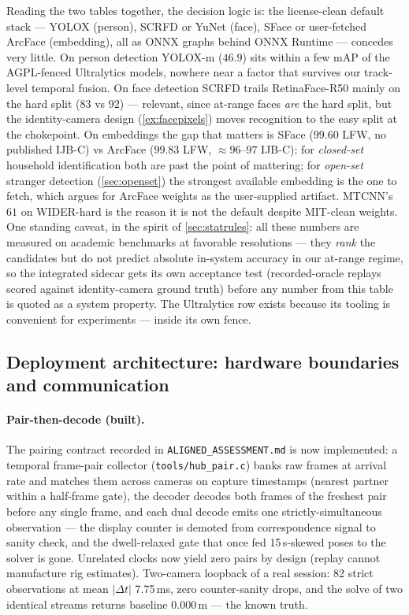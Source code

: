 \documentclass[11pt]{article}
\theoremstyle{definition}
\newcommand{\code}[1]{\texttt{#1}}
\begin{document}
Reading the two tables together, the decision logic is: the
license-clean default stack --- YOLOX (person), SCRFD or YuNet (face),
SFace or user-fetched ArcFace (embedding), all as ONNX graphs behind
ONNX Runtime --- concedes very little. On person detection YOLOX-m
($46.9$) sits within a few mAP of the AGPL-fenced Ultralytics models,
nowhere near a factor that survives our track-level temporal fusion. On
face detection SCRFD trails RetinaFace-R50 mainly on the hard split
($83$ vs $92$) --- relevant, since at-range faces \emph{are} the hard
split, but the identity-camera design (\autoref{ex:facepixels}) moves
recognition to the easy split at the chokepoint. On embeddings the gap
that matters is SFace ($99.60$ LFW, no published IJB-C) vs ArcFace
($99.83$ LFW, $\approx96$--$97$ IJB-C): for \emph{closed-set} household
identification both are past the point of mattering; for \emph{open-set}
stranger detection (\autoref{sec:openset}) the strongest available
embedding is the one to fetch, which argues for ArcFace weights as the
user-supplied artifact. MTCNN's $61$ on WIDER-hard is the reason it is
not the default despite MIT-clean weights. One standing caveat, in the
spirit of \autoref{sec:statrules}: all these numbers are measured on
academic benchmarks at favorable resolutions --- they \emph{rank} the
candidates but do not predict absolute in-system accuracy in our
at-range regime, so the integrated sidecar gets its own acceptance test
(recorded-oracle replays scored against identity-camera ground truth)
before any number from this table is quoted as a system property. The
Ultralytics row exists because its tooling is convenient for
experiments --- inside its own fence.

\subsection{Deployment architecture: hardware boundaries and communication}

\paragraph{Pair-then-decode (built).} The pairing contract recorded
in \code{ALIGNED\_ASSESSMENT.md} is now implemented: a temporal
frame-pair collector (\code{tools/hub\_pair.c}) banks raw frames at
arrival rate and matches them across cameras on capture timestamps
(nearest partner within a half-frame gate), the decoder decodes both
frames of the freshest pair before any single frame, and each dual
decode emits one strictly-simultaneous observation --- the display
counter is demoted from correspondence signal to sanity check, and the
dwell-relaxed gate that once fed 15\,s-skewed poses to the solver is
gone. Unrelated clocks now yield zero pairs by design (replay cannot
manufacture rig estimates). Two-camera loopback of a real session: 82
strict observations at mean \(|\Delta t|\) 7.75\,ms, zero
counter-sanity drops, and the solve of two identical streams returns
baseline 0.000\,m --- the known truth.
\end{document}
